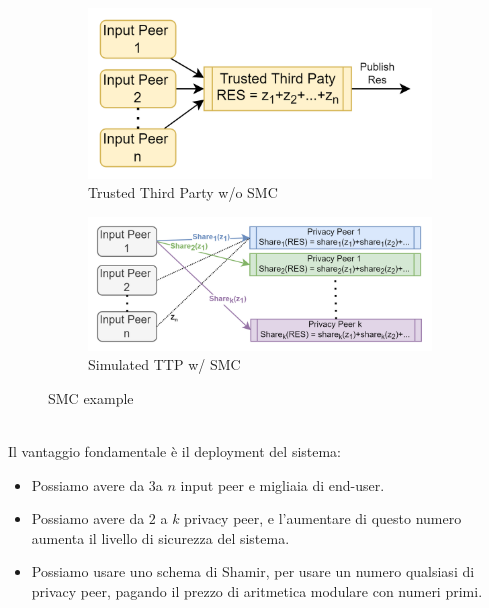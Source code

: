 \begin{figure}[h]
    \centering
    \begin{subfigure}[b]{0.4\textwidth}
    \includegraphics[width=\textwidth]{image/secret_sharing/ttp.png}
    \caption{Trusted Third Party w/o SMC}
    \label{fig:ttp}
    \end{subfigure}\quad
    \begin{subfigure}[b]{0.5\textwidth}
    \includegraphics[width=\textwidth]{image/secret_sharing/simulatedttp.png}
    \caption{Simulated TTP w/ SMC}
    \label{fig:smcttp}
    \end{subfigure}
    \caption{SMC example}
\end{figure}\\
Il vantaggio fondamentale è il deployment del sistema:
\begin{corollary}
\begin{itemize}
    \item Possiamo avere da $3$\footnotemark a $n$ input peer e migliaia di end-user.
    \item Possiamo avere da $2$ a $k$ privacy peer, e l'aumentare di questo numero aumenta il livello di sicurezza del sistema.
    \item Possiamo usare uno schema di Shamir, per usare un numero qualsiasi di privacy peer, pagando il prezzo di aritmetica modulare con numeri primi.
\end{itemize}
\end{corollary}\pagebreak
